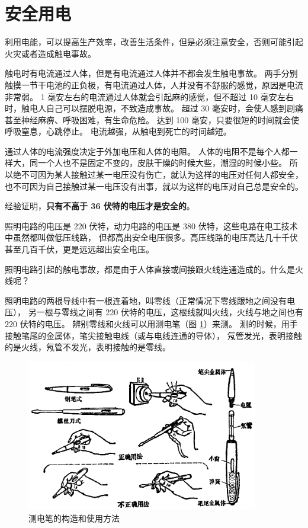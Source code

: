 \section{安全用电}\label{sec:11-4}

利用电能，可以提高生产效率，改善生活条件，但是必须注意安全，否则可能引起火灾或者造成触电事故。

触电时有电流通过人体，但是有电流通过人体并不都会发生触电事故。
两手分别触摸一节干电池的正负极，有电流通过人体，人并没有不舒服的感觉，原因是电流非常弱。
1 毫安左右的电流通过人体就会引起麻的感觉，但不超过 10 毫安左右时，触电人自己可以摆脱电源，不致造成事故。
超过 30 毫安时，会使人感到剧痛甚至神经麻痹、呼吸困难，有生命危险。
达到 100 毫安，只要很短的时间就会使呼吸窒息，心跳停止。
电流越强，从触电到死亡的时间越短。

通过人体的电流强度决定于外加电压和人体的电阻。
人体的电阻不是每个人都一样大，同一个人也不是固定不变的，皮肤干燥的时候大些，潮湿的时候小些。
所以绝不可因为某人接触过某一电压没有伤亡，就认为这样的电压对任何人都安全，
也不可因为自己接触过某一电压没有出事，就以为这样的电压对自己总是安全的。

经验证明，\textbf{只有不高于 36 伏特的电压才是安全的}。

照明电路的电压是 220 伏特，动力电路的电压是 380 伏特，这些电路在电工技术中虽然都叫做低压线路，
但都高出安全电压很多。高压线路的电压高达几十千伏甚至几百千伏，更是远远超出安全电压。

照明电路引起的触电事故，都是由于人体直接或间接跟火线连通造成的。什么是火线呢？

照明电路的两根导线中有一根连着地，叫零线（正常情况下零线跟地之间没有电压），
另一根与零线之间有 220 伏特的电压，这根线就叫火线，火线与地之间也有 220 伏特的电压。
辨别零线和火线可以用测电笔（图 \ref{fig:11-8}）来测。
测的时候，用手接触笔尾的金属体，笔尖接触电线（或与电线连通的导体），
氖管发光，表明接触的是火线，氖管不发光，表明接触的是零线。

\begin{figure}[htbp]
    \centering
    \includegraphics[width=0.9\textwidth]{../pic/czwl2-ch11-8}
    \caption{测电笔的构造和使用方法}\label{fig:11-8}
\end{figure}


